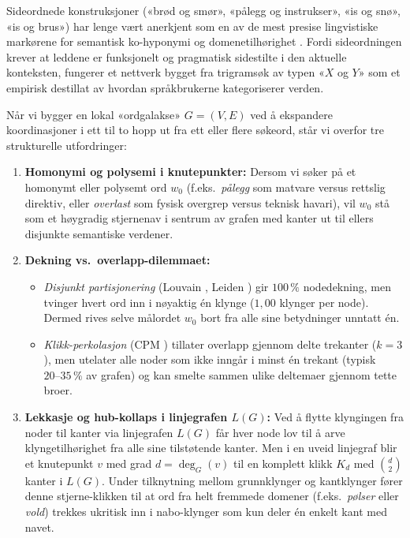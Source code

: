 \documentclass[11pt,a4paper]{article}
\begin{document}
Sideordnede konstruksjoner («brød og smør», «pålegg og instrukser», «is og snø», «is og brus») har lenge vært anerkjent som en av de mest presise lingvistiske markørene for semantisk ko-hyponymi og domenetilhørighet \cite{hearst1992automatic, widdows2002graph, dorow2003discovering}. Fordi sideordningen krever at leddene er funksjonelt og pragmatisk sidestilte i den aktuelle konteksten, fungerer et nettverk bygget fra trigramsøk av typen «$X$ og $Y$» som et empirisk destillat av hvordan språkbrukerne kategoriserer verden.

Når vi bygger en lokal «ordgalakse» $G = (V, E)$ ved å ekspandere koordinasjoner i ett til to hopp ut fra ett eller flere søkeord, står vi overfor tre strukturelle utfordringer:
\begin{enumerate}[label=\arabic*.]
  \item \textbf{Homonymi og polysemi i knutepunkter:} Dersom vi søker på et homonymt eller polysemt ord $w_0$ (f.eks.\ \emph{pålegg} som matvare versus rettslig direktiv, eller \emph{overlast} som fysisk overgrep versus teknisk havari), vil $w_0$ stå som et høygradig stjernenav i sentrum av grafen med kanter ut til ellers disjunkte semantiske verdener.
  \item \textbf{Dekning vs.\ overlapp-dilemmaet:}
    \begin{itemize}
      \item \emph{Disjunkt partisjonering} (Louvain \cite{blondel2008fast}, Leiden \cite{traag2019louvain}) gir $100\,\%$ nodedekning, men tvinger hvert ord inn i nøyaktig én klynge ($1{,}00$ klynger per node). Dermed rives selve målordet $w_0$ bort fra alle sine betydninger unntatt én.
      \item \emph{Klikk-perkolasjon} (CPM \cite{palla2005uncovering}) tillater overlapp gjennom delte trekanter ($k=3$), men utelater alle noder som ikke inngår i minst én trekant (typisk $20\text{--}35\,\%$ av grafen) og kan smelte sammen ulike deltemaer gjennom tette broer.
    \end{itemize}
  \item \textbf{Lekkasje og hub-kollaps i linjegrafen $L(G)$:} Ved å flytte klyngingen fra noder til kanter via linjegrafen $L(G)$ \cite{evans2009line, ahn2010link} får hver node lov til å arve klyngetilhørighet fra alle sine tilstøtende kanter. Men i en uveid linjegraf blir et knutepunkt $v$ med grad $d = \deg_G(v)$ til en komplett klikk $K_d$ med $\binom{d}{2}$ kanter i $L(G)$. Under tilknytning mellom grunnklynger og kantklynger fører denne stjerne-klikken til at ord fra helt fremmede domener (f.eks.\ \emph{pølser} eller \emph{vold}) trekkes ukritisk inn i nabo-klynger som kun deler én enkelt kant med navet.
\end{enumerate}
\end{document}
